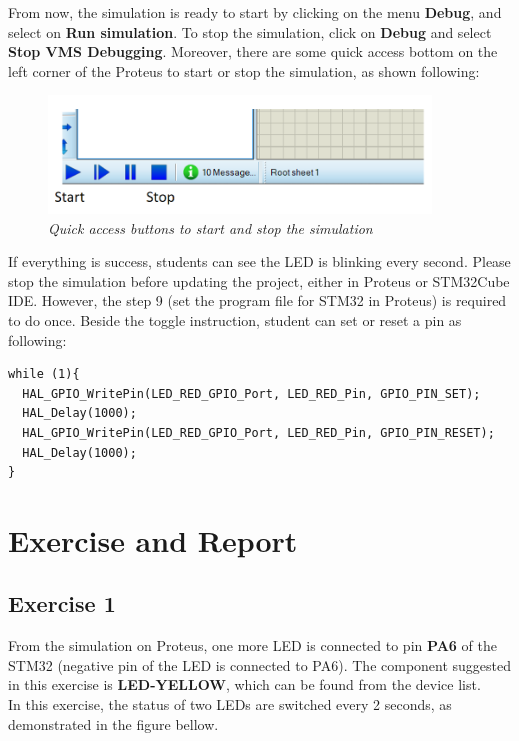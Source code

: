 From now, the simulation is ready to start by clicking on the menu \textbf{Debug}, and select on \textbf{Run simulation}. To stop the simulation, click on \textbf{Debug} and select \textbf{Stop VMS Debugging}. Moreover, there are some quick access bottom on the left corner of the Proteus to start or stop the simulation, as shown following:\\
\begin{figure}[!htp]
    \centering
    \includegraphics[width=4in]{source/picture/bai_1/pic18a.PNG}
    \caption{\textit{Quick access buttons to start and stop the simulation}}
    \label{bai1_pic18}
\end{figure}

If everything is success, students can see the LED is blinking every second. Please stop the simulation before updating the project, either in Proteus or STM32Cube IDE. However, the step 9 (set the program file for STM32 in Proteus) is required to do once. Beside the toggle instruction, student can set or reset a pin as following:

\begin{lstlisting}[caption=An example for LED blinky]
while (1){
  HAL_GPIO_WritePin(LED_RED_GPIO_Port, LED_RED_Pin, GPIO_PIN_SET);
  HAL_Delay(1000);
  HAL_GPIO_WritePin(LED_RED_GPIO_Port, LED_RED_Pin, GPIO_PIN_RESET);
  HAL_Delay(1000);
}
\end{lstlisting}
\newpage
\section{Exercise and Report}
\subsection{Exercise 1}
From the simulation on Proteus, one more LED is connected to pin \textbf{PA6} of the STM32 (negative pin of the LED is connected to PA6). The component suggested in this exercise is \textbf{LED-YELLOW}, which can be found from the device list.\\



In this exercise, the status of two LEDs are switched every 2 seconds, as demonstrated in the figure bellow.

